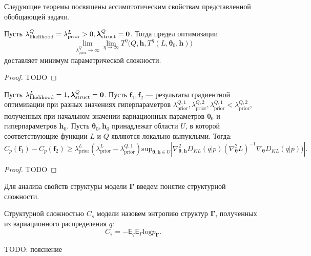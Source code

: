 Следующие теоремы посвящены ассимптотическим свойствам представленной обобщающей задачи.
\begin{theorem}
Пусть ${\lambda_{\text{likelihood}}^Q}= {\lambda_{\text{prior}}^L}>0, {\boldsymbol{\lambda}^Q_{\text{struct}} }= \bf{0}$.
Тогда предел оптимизации
\[
\lim_{{\lambda^Q_\text{prior}} \to \infty} \lim_{\eta \to \infty}   T^\eta\bigl(Q, \mathbf{h}, T^\eta(L, \boldsymbol{\theta}_0, \mathbf{h})\bigr)
\]  
доставляет минимум параметрической сложности. 
\end{theorem}
\begin{proof}
TODO
\end{proof}

\begin{theorem}
Пусть ${\lambda^L_{\text{likelihood}}} = 1 ,{\boldsymbol{\lambda}^Q_{\text{struct}}} = \bf 0$.
Пусть  $\mathbf{f}_1, \mathbf{f}_2$ --- результаты градиентной оптимизации при разных значениях гиперпараметров ${\lambda_{\text{prior}}^{Q,1},\lambda_{\text{prior}}^{Q,2}, \lambda_{\text{prior}}^{Q,1}<\lambda_{\text{prior}}^{Q,2}}$, полученных при начальном значении вариационных параметров $\boldsymbol{\theta}_0$ и гиперпараметров $\mathbf{h}_0$.
Пусть $\boldsymbol{\theta}_0, \mathbf{h}_0$ принадлежат области  $U$, в которой соответствующие функции $L$ и $Q$ являются локально-выпуклыми.
Тогда:
\[
    C_p(\mathbf{f}_1) - C_p(\mathbf{f}_2)  \geq {\lambda_\text{prior}^L(\lambda_\text{prior}^L - \lambda_\text{prior}^{Q,1})}\text{sup}_{\boldsymbol{\theta}, \mathbf{h} \in U}|\nabla^2_{\boldsymbol{\theta}, \mathbf{h}} {D_{KL}(q|p)} (\nabla^2_{\boldsymbol{\theta}} L)^{-1}   \nabla_{\boldsymbol{\theta}} {D_{KL}(q|p))}|.
\]
\end{theorem}
\begin{proof}
TODO
\end{proof}

Для анализа свойств структуры модели $\boldsymbol{\Gamma}$ введем понятие структурной сложности.
\begin{defin}
Структурной сложностью $C_s$ модели назовем энтропию структур $\boldsymbol{\Gamma}$, полученных из вариационного распределения $q$:
\[
    C_s = -\mathsf{E}_q \mathsf{E}_\Gamma \text{log} p_{\boldsymbol{\Gamma}}.
\]
\end{defin}
TODO: пояснение

